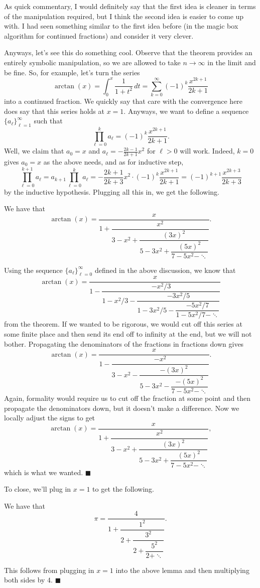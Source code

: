 As quick commentary, I would definitely say that the first idea is cleaner in terms of the manipulation required, but I think the second idea is easier to come up with. I had seen something similar to the first idea before (in the magic box algorithm for continued fractions) and consider it very clever.

Anyways, let's see this do something cool. Observe that the theorem provides an entirely symbolic manipulation, so we are allowed to take $n\to\infty$ in the limit and be fine. So, for example, let's turn the series
\[\arctan(x)=\int_0^x\frac1{1+t^2}\,dt=\sum_{k=0}^\infty(-1)^k\frac{x^{2k+1}}{2k+1}\]
into a continued fraction. We quickly say that care with the convergence here does say that this series holds at $x=1.$ Anyways, we want to define a sequence $\{a_\ell\}_{\ell=1}^\infty$ such that
\[\prod_{\ell=0}^ka_\ell=(-1)^k\frac{x^{2k+1}}{2k+1}.\]
Well, we claim that $a_0=x$ and $a_\ell=-\frac{2k-1}{2k+1}x^2$ for $\ell>0$ will work. Indeed, $k=0$ gives $a_0=x$ as the above needs, and as for inductive step,
\[\prod_{\ell=0}^{k+1}a_\ell=a_{k+1}\prod_{\ell=0}^ka_\ell=-\frac{2k+1}{2k+3}x^2\cdot(-1)^k\frac{x^{2k+1}}{2k+1}=(-1)^{k+1}\frac{x^{2k+3}}{2k+3}\]
by the inductive hypothesis. Plugging all this in, we get the following.
\begin{lemma}
    We have that
    \[\arctan(x)=\dfrac x{1+\dfrac{x^2}{3-x^2+\dfrac{(3x)^2}{5-3x^2+\dfrac{(5x)^2}{7-5x^2-\ddots}}}}.\]
\end{lemma}
Using the sequence $\{a_\ell\}_{\ell=0}^\infty$ defined in the above discussion, we know that
\[\arctan(x)=\dfrac x{1-\dfrac{-x^2/3}{1-x^2/3-\dfrac{-3x^2/5}{1-3x^2/5-\dfrac{-5x^2/7}{1-5x^2/7-\ddots}}}}\]
from the theorem. If we wanted to be rigorous, we would cut off this series at some finite place and then send its end off to infinity at the end, but we will not bother. Propagating the denominators of the fractions in fractions down gives
\[\arctan(x)=\dfrac x{1-\dfrac{-x^2}{3-x^2-\dfrac{-(3x)^2}{5-3x^2-\dfrac{-(5x)^2}{7-5x^2-\ddots}}}}.\]
Again, formality would require us to cut off the fraction at some point and then propagate the denominators down, but it doesn't make a difference. Now we locally adjust the signs to get
\[\arctan(x)=\dfrac x{1+\dfrac{x^2}{3-x^2+\dfrac{(3x)^2}{5-3x^2+\dfrac{(5x)^2}{7-5x^2-\ddots}}}},\]
which is what we wanted. $\blacksquare$

To close, we'll plug in $x=1$ to get the following.
\begin{proposition}
    We have that
    \[\pi=\dfrac4{1+\dfrac{1^2}{2+\dfrac{3^2}{2+\dfrac{5^2}{2+\ddots}}}}.\]
\end{proposition}
This follows from plugging in $x=1$ into the above lemma and then multiplying both sides by $4.$ $\blacksquare$

